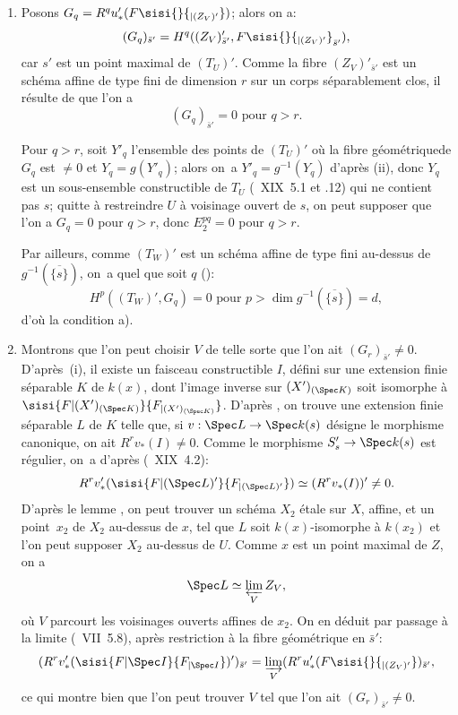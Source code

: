 \begin{enumerate}
\item[$1^\circ)$]
Posons $G_q = R^q u'_*(F\sisi{}{_{|(Z_V)'}})$; alors on a:
$$(G_q)_{\bar{s}'}=H^q((Z_V)'_{\bar{s}'}, F\sisi{}{{_{|(Z_V)'}}}_{\bar{s}'}),
$$
car $s'$ est un point maximal de $(T_U)'$. Comme la fibre $(Z_V)'_{\bar{s}'}$ est un sch\'ema affine de type fini de dimension $r$ sur un corps s\'eparablement clos, il r\'esulte de  que l'on a
$$(G_q)_{\bar{s}'}=0 \text{ pour } q>r.
$$

Pour $q>r$, soit $Y'_q$ l'ensemble des points de $(T_U)'$ o\`u la fibre g\'eom\'etrique\pageoriginale de $G_q$ est $\neq 0$ et $Y_q=g(Y'_q)$; alors on~a $Y'_q = g^{-1}(Y_q)$ d'apr\`es \textup{(ii)}, donc $Y_q$ est un sous-ensemble constructible de $T_U$ (~XIX~5.1 et .12) qui ne contient pas $s$; quitte \`a restreindre $U$ \`a voisinage ouvert de $s$, on peut supposer que l'on a $G_q=0$ pour $q>r$, donc $E_2^{pq}=0$ pour $q>r$.

Par ailleurs, comme $(T_W)'$ est un sch\'ema affine de type fini au-dessus de $g^{-1}(\overline{\{s\}})$, on~a quel que soit $q$ (\cf {}):
$$H^p((T_W)', G_q)=0 \text{ pour } p>\dim g^{-1}(\overline{\{s\}})=d,
$$
d'o\`u la condition a).

\item[$2^\circ)$]
Montrons que l'on peut choisir $V$ de telle sorte que l'on ait $(G_r)_{\bar{s}'} \neq 0$. D'apr\`es~\textup{(i)}, il existe un faisceau constructible $I$, d\'efini sur une extension finie s\'eparable $K$ de $k(x)$, dont l'image inverse sur $(X')_{(\Spec K)}$ soit isomorphe \`a $\sisi{F{|(X')_{(\Spec K)}}}{F_{|(X')_{(\Spec K)}}}$. D'apr\`es , on trouve une extension finie s\'eparable $L$ de $K$ telle que, si $v:\Spec L \to \Spec k(s)$ d\'esigne le morphisme canonique, on ait $R^r v_*(I) \neq 0$. Comme le morphisme $S'_s \to \Spec k(s)$ est r\'egulier, on~a d'apr\`es (~XIX~4.2):
$$R^rv_*'(\sisi{F{|(\Spec L)'}}{F_{|(\Spec L)'}}) \simeq (R^rv_*(I))' \neq 0.
$$
D'apr\`es le lemme , on peut trouver un sch\'ema $X_2$ \'etale sur $X$, affine, et un point~$x_2$ de $X_2$ au-dessus de $x$, tel que $L$ soit $k(x)$-isomorphe \`a $k(x_2)$ et l'on peut supposer $X_2$ au-dessus de $U$. Comme $x$ est un point maximal de $Z$, on a\pageoriginale
$$
\Spec L \simeq \varprojlim_V Z_V,
$$
o\`u $V$ parcourt les voisinages ouverts affines de $x_2$. On en d\'eduit par passage \`a la limite (~VII~5.8), apr\`es restriction \`a la fibre g\'eom\'etrique en $\bar{s}'$:
$$
(R^rv_*'(\sisi{F{|\Spec I}}{F_{|\Spec I}})')_{\bar{s}'} = \varinjlim_V (R^ru_*'(F\sisi{}{_{|(Z_V)'}})_{\bar{s}'},
$$
ce qui montre bien que l'on peut trouver $V$ tel que l'on ait $(G_r)_{\bar{s}'} \neq 0$.


\end{enumerate}
